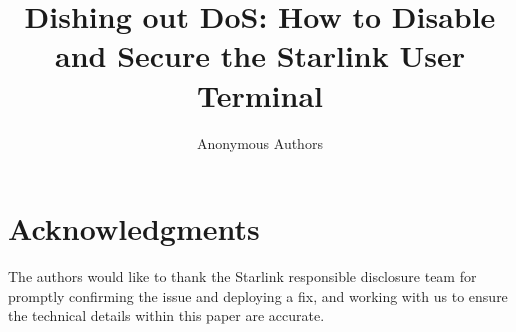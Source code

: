 \documentclass[conference]{IEEEtran}
\begin{document}
\title{Dishing out DoS: How to Disable\\and Secure the Starlink User Terminal}

\author{Anonymous Authors}

\begin{comment}
\author{\IEEEauthorblockN{Joshua Smailes}
\IEEEauthorblockA{University of Oxford\\
joshua.smailes@cs.ox.ac.uk}
\and
\IEEEauthorblockN{Edd Salkield}
\IEEEauthorblockA{University of Oxford\\
edd.salkield@cs.ox.ac.uk}
\and
\IEEEauthorblockN{Simon Birnbach}
\IEEEauthorblockA{University of Oxford\\
simon.birnbach@cs.ox.ac.uk}
\and
\IEEEauthorblockN{Martin Strohmeier}
\IEEEauthorblockA{Cyber-Defence Campus, armasuisse Science + Technology\\
martin.strohmeier@armasuisse.ch}
\and
\IEEEauthorblockN{Ivan Martinovic}
\IEEEauthorblockA{University of Oxford\\
ivan.martinovic@cs.ox.ac.uk}}
\end{comment}

\begin{comment}
\IEEEoverridecommandlockouts
\makeatletter\def\@IEEEpubidpullup{6.5\baselineskip}\makeatother
\IEEEpubid{\parbox{\columnwidth}{
    Network and Distributed System Security (NDSS) Symposium 2023\\
    28 February - 4 March 2023, San Diego, CA, USA\\
    ISBN 1-891562-83-5\\
    https://dx.doi.org/10.14722/ndss.2023.23xxx\\
    www.ndss-symposium.org
}
\hspace{\columnsep}\makebox[\columnwidth]{}}
\end{comment}

\maketitle










\section*{Acknowledgments}

The authors would like to thank the Starlink responsible disclosure team for promptly confirming the issue and deploying a fix, and working with us to ensure the technical details within this paper are accurate.

\clearpage





\appendices



\end{document}

